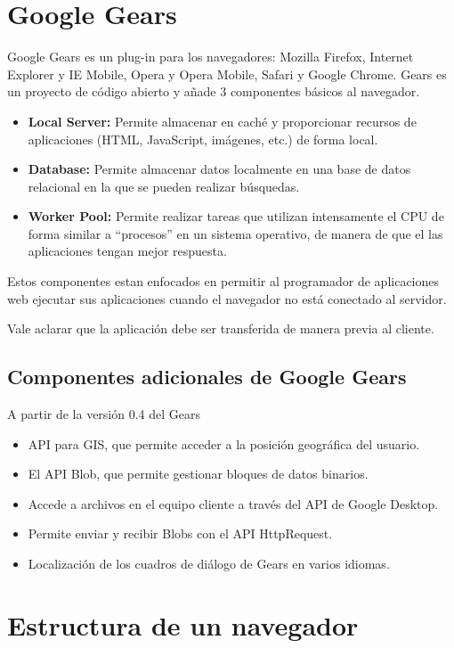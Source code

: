 \documentclass[a4paper]{report}
\begin{document}
\section{Google Gears}
Google Gears es un plug-in para los navegadores: Mozilla Firefox, Internet
Explorer y IE Mobile, Opera y Opera Mobile, Safari y Google Chrome. Gears es
un proyecto de código abierto y añade 3 componentes básicos al navegador.
\begin{itemize}
  \item {\textbf{Local Server:} Permite almacenar en caché y proporcionar
  recursos de aplicaciones (HTML, JavaScript, imágenes, etc.) de forma local. }
  \item {\textbf{Database:} Permite almacenar datos localmente en una base
  de datos relacional en la que se pueden realizar búsquedas. }
  \item { \textbf{Worker Pool:} Permite realizar tareas que utilizan
  intensamente el CPU de forma similar a ``procesos'' en un sistema operativo, de manera de que el 
  las aplicaciones tengan mejor respuesta.}
\end{itemize}
Estos componentes estan enfocados en permitir al programador de aplicaciones web
ejecutar sus aplicaciones cuando el navegador no está conectado al servidor.

Vale aclarar que la aplicación debe ser transferida de manera previa al cliente.

\subsection{Componentes adicionales de Google Gears}
A partir de la versión 0.4 del Gears
\begin{itemize}
  \item{API para GIS, que permite acceder a la posición geográfica del usuario.}
  \item {El API Blob, que permite gestionar bloques de datos binarios.}
  \item {Accede a archivos en el equipo cliente a través del API de Google
  Desktop.}
  \item {Permite enviar y recibir Blobs con el API HttpRequest.}
  \item {Localización de los cuadros de diálogo de Gears en varios idiomas.}  
\end{itemize}



\section{Estructura de un navegador}
\end{document}
